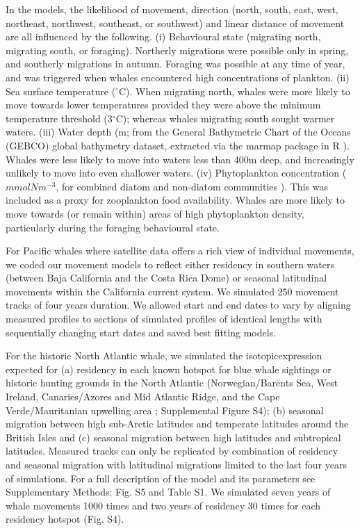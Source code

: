 \documentclass[a4paper,12pt]{article}
\begin{document}
In the models, the likelihood of movement, direction (north, south, east, west, northeast, northwest, southeast, or southwest) and linear distance of movement are all influenced by the following. 
(i) Behavioural state (migrating north, migrating south, or foraging).
Northerly migrations were possible only in spring, and southerly migrations in autumn. 
Foraging was possible at any time of year, and was triggered when whales encountered high concentrations of plankton.
(ii) Sea surface temperature \cite{yool2013medusa} ($^{\circ}$C). 
When migrating north, whales were more likely to move towards lower temperatures provided they were above the minimum temperature threshold (3$^{\circ}$C); whereas whales migrating south sought warmer waters.  
(iii) Water depth (m; from the General Bathymetric Chart of the Oceans (GEBCO) global bathymetry dataset\cite{bathy}, extracted via the marmap package in R \cite{marmap}). 
Whales were less likely to move into waters less than 400m deep, and increasingly unlikely to move into even shallower waters. 
(iv) Phytoplankton concentration ($mmolNm^{-3}$, for combined diatom and non-diatom communities \cite{yool2013medusa}). 
This was included as a proxy for zooplankton food availability. 
Whales are more likely to move towards (or remain within) areas of high phytoplankton density, particularly during the foraging behavioural state. 

For Pacific whales where satellite data offers a rich view of individual movements, we coded our movement models to reflect either residency in southern waters (between Baja California and the Costa Rica Dome) or seasonal latitudinal movements within the California current system. 
We simulated 250 movement tracks of four years duration. 
We allowed start and end dates to vary by aligning measured profiles to sections of simulated profiles of identical lengths with sequentially changing start dates and saved best fitting models.

For the historic North Atlantic whale, we simulated the isotopicexpression expected for (a) residency in each known hotspot for blue whale sightings or historic hunting grounds in the North Atlantic (Norwegian/Barents Sea, West Ireland, Canaries/Azores and Mid Atlantic Ridge, and the Cape Verde/Mauritanian upwelling area \cite{mcdonald2006biogeographic,reilly2008balaenoptera,sigurjonsson1995life}; Supplemental Figure S4); (b) seasonal migration between high sub-Arctic latitudes and temperate latitudes around the British Isles and (c) seasonal migration between high latitudes and subtropical latitudes.
Measured tracks can only be replicated by combination of residency and seasonal migration with latitudinal migrations limited to the last four
years of simulations. 
For a full description of the model and its parameters see Supplementary Methods: Fig. S5 and Table S1. 
We simulated seven years of whale movements 1000 times and two years of residency 30 times for each residency hotspot (Fig. S4).
\end{document}
